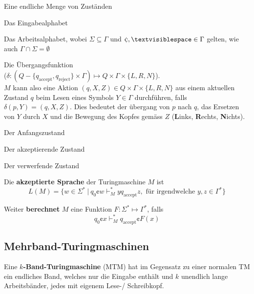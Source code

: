 \documentclass[11pt]{article}
\begin{document}
\begin{description}[labelindent=16pt,style=multiline,leftmargin=4.5cm, noitemsep]
	\item[$Q$:] Eine endliche Menge von Zust{\"a}nden
	\item[$\Sigma$:] Das Eingabealphabet
	\item[$\Gamma$:] Das Arbeitsalphabet, wobei $\Sigma \subseteq \Gamma$ und $\cent, \textvisiblespace \in \Gamma$ gelten, wie auch $\Gamma \cap \Sigma = \emptyset$
	\item[$\delta$:] Die {\"U}bergangsfunktion\\ ($\delta: (Q-\{q_\text{accept}, q_\text{reject}\}\times\Gamma) \mapsto Q\times\Gamma\times\{L,R,N\}$).  \\$M$ kann also eine Aktion $(q, X, Z) \in Q \times \Gamma \times \{L, R, N\}$ aus einem aktuellen Zustand $q$ beim Lesen eines Symbols $Y \in \Gamma$ durchf{\"u}hren, falls $\delta(p, Y) = (q, X, Z)$. Dies bedeutet der {\"u}bergang von $p$ nach $q$, das Ersetzen von $Y$ durch $X$ und die Bewegung des Kopfes gem{\"a}ss $Z$ (\textbf{L}inks, \textbf{R}echts, \textbf{N}ichts).
	\item[$q_0 \in Q$:] Der Anfangszustand
	\item[$q_\text{\normalfont accept} \in Q$:] Der akzeptierende Zustand
	\item[$q_\text{\normalfont reject} \in Q-\{q_\text{\normalfont accept}\}$:] Der verwerfende Zustand
\end{description}

Die \textbf{akzeptierte Sprache} der Turingmaschine $M$ ist
\begin{equation*}
	L(M) = \{w \in \Sigma^*\ |\ q_0\cent w \vdash_M^* yq_\text{accept}z,\text{ f{\"u}r irgendwelche }y,z \in \Gamma^*\}
\end{equation*}

Weiter \textbf{berechnet} $M$ eine Funktion $F:\Sigma^* \mapsto \Gamma^*$, falls
\begin{equation*}
	q_0\cent x \vdash_M^* q_\text{accept}\cent F(x)
\end{equation*}

\subsection{Mehrband-Turingmaschinen}

Eine \textbf{$k$-Band-Turingmaschine} (MTM) hat im Gegensatz zu einer normalen TM ein endliches Band, welches nur die Eingabe enth{\"a}lt und $k$ unendlich lange Arbeitsb{\"a}nder, jedes mit eigenem Lese-/ Schreibkopf.
\end{document}

